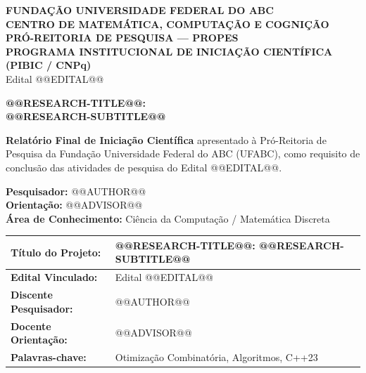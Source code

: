 \documentclass[12pt,a4paper]{article}
\begin{document}
\setlength{\emergencystretch}{3em}
\onehalfspacing

\thispagestyle{empty}

\begin{center}
    {\large\textbf{FUNDAÇÃO UNIVERSIDADE FEDERAL DO ABC}}\\[0.15cm]
    {\large\textbf{CENTRO DE MATEMÁTICA, COMPUTAÇÃO E COGNIÇÃO}}\\[0.15cm]
    {\textbf{PRÓ-REITORIA DE PESQUISA --- PROPES}}\\[0.1cm]
    {\small\textbf{PROGRAMA INSTITUCIONAL DE INICIAÇÃO CIENTÍFICA (PIBIC / CNPq)}}\\[0.1cm]
    {\footnotesize Edital @@EDITAL@@}
\end{center}

\vspace{1.0cm}

\begin{center}
    {\LARGE\textbf{@@RESEARCH-TITLE@@:}}\\[0.3cm]
    {\Large\textbf{@@RESEARCH-SUBTITLE@@}}\par
\end{center}

\vspace{0.8cm}

\begin{flushright}
\begin{minipage}{0.6\textwidth}
\small
{}
\textbf{Relatório Final de Iniciação Científica} apresentado à Pró-Reitoria de Pesquisa da Fundação Universidade Federal do ABC (UFABC), como requisito de conclusão das atividades de pesquisa do Edital @@EDITAL@@.\par
\vspace{0.3cm}
\textbf{Pesquisador:} @@AUTHOR@@\\
\textbf{Orientação:} @@ADVISOR@@\\
\textbf{Área de Conhecimento:} Ciência da Computação / Matemática Discreta
\end{minipage}
\end{flushright}

\vspace{0.8cm}

\begin{center}
\small
{}
\begin{tabular}{|p{}|>{\raggedright\arraybackslash}p{}|}
\hline
\textbf{Título do Projeto:} & @@RESEARCH-TITLE@@: @@RESEARCH-SUBTITLE@@ \\ \hline
\textbf{Edital Vinculado:} & Edital @@EDITAL@@ \\ \hline
\textbf{Discente Pesquisador:} & @@AUTHOR@@ \\ \hline
\textbf{Docente Orientação:} & @@ADVISOR@@ \\ \hline
\textbf{Palavras-chave:} & Otimização Combinatória, Algoritmos, C++23 \\ \hline
\end{tabular}
\end{center}
\end{document}
